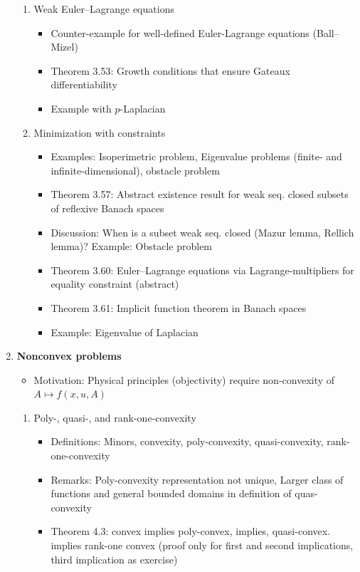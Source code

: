 \documentclass[12pt,a4paper]{article}
\begin{document}
\begin{enumerate}
\begin{enumerate}
        \item Weak Euler--Lagrange equations
        \begin{itemize}
        \item Counter-example for well-defined Euler-Lagrange equations (Ball--Mizel)
            \item Theorem 3.53: Growth conditions that ensure Gateaux differentiability 
            \item Example with $p$-Laplacian
        \end{itemize}
        \item Minimization with constraints
        \begin{itemize}
            \item Examples: Isoperimetric problem, Eigenvalue problems (finite- and infinite-dimensional), obstacle problem
            \item Theorem 3.57: Abstract existence result for weak seq. closed subsets of reflexive Banach spaces
            \item Discussion: When is a subset weak seq. closed (Mazur lemma, Rellich lemma)? Example: Obstacle problem
            \item Theorem 3.60: Euler--Lagrange equations via Lagrange-multipliers for equality constraint (abstract)
            \item Theorem 3.61: Implicit function theorem in Banach spaces
            \item Example: Eigenvalue of Laplacian
        \end{itemize}
    \end{enumerate}
    \item \textbf{Nonconvex problems}
        \begin{itemize}
            \item Motivation: Physical principles (objectivity) require non-convexity of $A\mapsto f(x,u,A)$ 
        \end{itemize}
    \begin{enumerate}
        \item Poly-, quasi-, and rank-one-convexity
        \begin{itemize}
            \item Definitions: Minors, convexity, poly-convexity, quasi-convexity, rank-one-convexity
            \item Remarks: Poly-convexity representation not unique, Larger class of functions and general bounded domains in definition of quas-convexity
            \item Theorem 4.3: convex implies poly-convex, implies, quasi-convex. implies rank-one convex (proof only for first and second implications, third implication as exercise)

\end{itemize}
\end{enumerate}
\end{enumerate}
\end{document}
